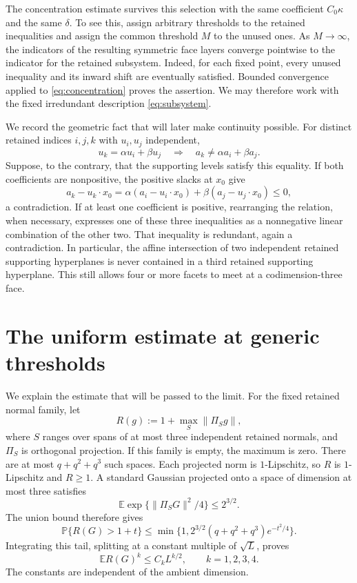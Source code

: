 \documentclass[11pt]{article}
\newcommand{\E}{\mathbb E}
\newcommand{\PP}{\mathbb P}
\newcommand{\norm}[1]{\lVert #1\rVert}
\begin{document}
The concentration estimate survives this selection with the same
coefficient $C_0\kappa$ and the same $\delta$. To see this, assign
arbitrary thresholds to the retained inequalities and assign the
common threshold $M$ to the unused ones. As $M\to\infty$, the
indicators of the resulting symmetric face layers converge pointwise
to the indicator for the retained subsystem. Indeed, for each fixed
point, every unused inequality and its inward shift are eventually
satisfied. Bounded convergence applied to
\eqref{eq:concentration} proves the assertion. We may therefore work
with the fixed irredundant description \eqref{eq:subsystem}.

We record the geometric fact that will later make continuity possible.
For distinct retained indices $i,j,k$ with $u_i,u_j$ independent,
\begin{equation}\label{eq:no-affine-triple}
 u_k=\alpha u_i+\beta u_j
 \quad\Longrightarrow\quad
 a_k\ne\alpha a_i+\beta a_j.
\end{equation}
Suppose, to the contrary, that the supporting levels satisfy this
equality. If both coefficients are nonpositive, the positive slacks
at $x_0$ give
\[
 a_k-u_k\cdot x_0
 =\alpha(a_i-u_i\cdot x_0)+\beta(a_j-u_j\cdot x_0)\le0,
\]
a contradiction. If at least one coefficient is positive, rearranging
the relation, when necessary, expresses one of these three
inequalities as a nonnegative linear combination of the other two.
That inequality is redundant, again a contradiction. In particular,
the affine intersection of two independent retained supporting
hyperplanes is never contained in a third retained supporting
hyperplane. This still allows four or more facets to meet at a
codimension-three face.

\section{The uniform estimate at generic thresholds}

We explain the estimate that will be passed to the limit. For the
fixed retained normal family, let
\[
 R(g):=1+\max_S\norm{\Pi_Sg},
\]
where $S$ ranges over spans of at most three independent retained
normals, and $\Pi_S$ is orthogonal projection. If this family is empty,
the maximum is zero. There are at most $q+q^2+q^3$ such spaces.
Each projected norm is $1$-Lipschitz, so $R$ is $1$-Lipschitz and
$R\ge1$. A standard Gaussian projected onto a space of dimension at
most three satisfies
\[
 \E\exp\{\norm{\Pi_SG}^2/4\}\le2^{3/2}.
\]
The union bound therefore gives
\[
 \PP\{R(G)>1+t\}
 \le\min\{1,2^{3/2}(q+q^2+q^3)e^{-t^2/4}\}.
\]
Integrating this tail, splitting at a constant multiple of
$\sqrt L$, proves
\begin{equation}\label{eq:moments}
 \E R(G)^k\le C_kL^{k/2},\qquad k=1,2,3,4.
\end{equation}
The constants are independent of the ambient dimension.
\end{document}
